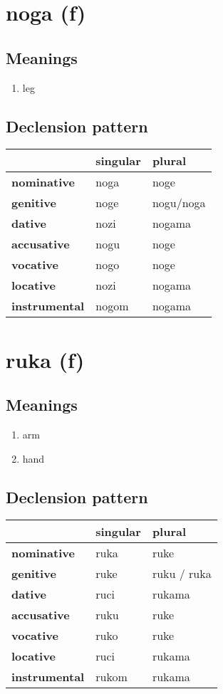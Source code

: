 \filbreak
\section{noga (f)}
\subsection*{Meanings}
\begin{enumerate}
\item leg
\end{enumerate}
\subsection*{Declension pattern}
\begin{tabularx}{\linewidth}{Xll}
\toprule
{} & singular &     plural \\
\midrule
\textbf{nominative  } &     noga &       noge \\
\textbf{genitive    } &     noge &  nogu/noga \\
\textbf{dative      } &     nozi &     nogama \\
\textbf{accusative  } &     nogu &       noge \\
\textbf{vocative    } &     nogo &       noge \\
\textbf{locative    } &     nozi &     nogama \\
\textbf{instrumental} &    nogom &     nogama \\
\bottomrule
\end{tabularx}

\filbreak
\section{ruka (f)}
\subsection*{Meanings}
\begin{enumerate}
\item arm
\item hand
\end{enumerate}
\subsection*{Declension pattern}
\begin{tabularx}{\linewidth}{Xll}
\toprule
{} & singular &       plural \\
\midrule
\textbf{nominative  } &     ruka &         ruke \\
\textbf{genitive    } &     ruke &  ruku / ruka \\
\textbf{dative      } &     ruci &       rukama \\
\textbf{accusative  } &     ruku &         ruke \\
\textbf{vocative    } &     ruko &         ruke \\
\textbf{locative    } &     ruci &       rukama \\
\textbf{instrumental} &    rukom &       rukama \\
\bottomrule
\end{tabularx}

